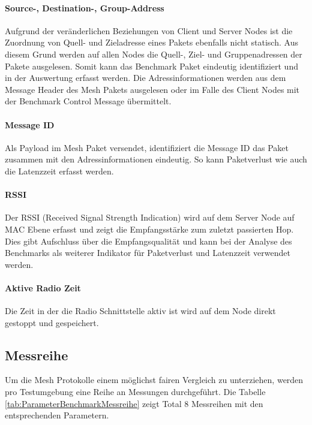 \paragraph{Source-, Destination-, Group-Address}
Aufgrund der veränderlichen Beziehungen von Client und Server Nodes ist die Zuordnung von Quell- und Zieladresse eines Pakets ebenfalls nicht statisch. Aus diesem Grund werden auf allen Nodes die Quell-, Ziel- und Gruppenadressen der Pakete ausgelesen. 
Somit kann das Benchmark Paket eindeutig identifiziert und in der Auswertung erfasst werden.
Die Adressinformationen werden aus dem Message Header des Mesh Pakets ausgelesen oder im Falle des Client Nodes mit der Benchmark Control Message übermittelt.

\paragraph{Message ID}
Als Payload im Mesh Paket versendet, identifiziert die Message ID das Paket zusammen mit den Adressinformationen eindeutig. So kann Paketverlust wie auch die Latenzzeit erfasst werden.

\paragraph{RSSI}
Der RSSI (Received Signal Strength Indication) wird auf dem Server Node auf MAC Ebene erfasst und zeigt die Empfangsstärke zum zuletzt passierten Hop. Dies gibt Aufschluss über die Empfangsqualität und kann bei der Analyse des Benchmarks als weiterer Indikator für Paketverlust und Latenzzeit verwendet werden.

\paragraph{Aktive Radio Zeit}
Die Zeit in der die Radio Schnittstelle aktiv ist wird auf dem Node direkt gestoppt und gespeichert.


\subsection{Messreihe}\label{subsec:Messreihe}
Um die Mesh Protokolle einem möglichst fairen Vergleich zu unterziehen, werden pro Testumgebung eine Reihe an Messungen durchgeführt. Die Tabelle \ref{tab:ParameterBenchmarkMessreihe} zeigt Total 8 Messreihen mit den entsprechenden Parametern.


